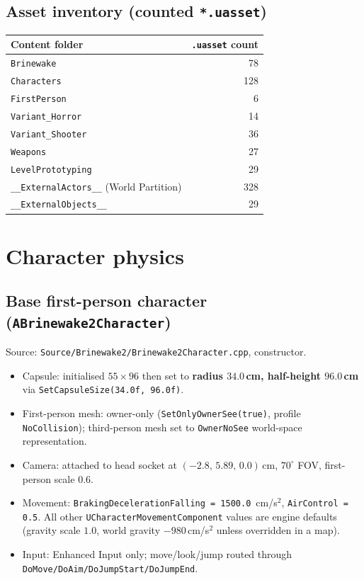 \documentclass[11pt,a4paper]{article}
\begin{document}
\subsection{Asset inventory (counted \texttt{*.uasset})}
\begin{center}
\begin{tabular}{@{}lr@{}}
\toprule
Content folder & \texttt{.uasset} count \\
\midrule
\texttt{Brinewake} & 78 \\
\texttt{Characters} & 128 \\
\texttt{FirstPerson} & 6 \\
\texttt{Variant\_Horror} & 14 \\
\texttt{Variant\_Shooter} & 36 \\
\texttt{Weapons} & 27 \\
\texttt{LevelPrototyping} & 29 \\
\texttt{\_\_ExternalActors\_\_} (World Partition) & 328 \\
\texttt{\_\_ExternalObjects\_\_} & 29 \\
\bottomrule
\end{tabular}
\end{center}

\section{Character physics}
\label{sec:charphys}

\subsection{Base first-person character (\texttt{ABrinewake2Character})}
Source: \texttt{Source/Brinewake2/Brinewake2Character.cpp}, constructor.

\begin{itemize}[leftmargin=1.4em]
  \item Capsule: initialised $55 \times 96$ then set to \textbf{radius $34.0$\,cm, half-height $96.0$\,cm} via \texttt{SetCapsuleSize(34.0f, 96.0f)}.
  \item First-person mesh: owner-only (\texttt{SetOnlyOwnerSee(true)}, profile \texttt{NoCollision}); third-person mesh set to \texttt{OwnerNoSee} world-space representation.
  \item Camera: attached to head socket at $(-2.8,\,5.89,\,0.0)$\,cm, $70^\circ$ FOV, first-person scale $0.6$.
  \item Movement: \texttt{BrakingDecelerationFalling = 1500.0}~cm/s$^2$, \texttt{AirControl = 0.5}. All other \texttt{UCharacterMovementComponent} values are engine defaults (gravity scale $1.0$, world gravity $-980$\,cm/s$^2$ unless overridden in a map).
  \item Input: Enhanced Input only; move/look/jump routed through \texttt{DoMove/DoAim/DoJumpStart/DoJumpEnd}.
\end{itemize}
\end{document}
